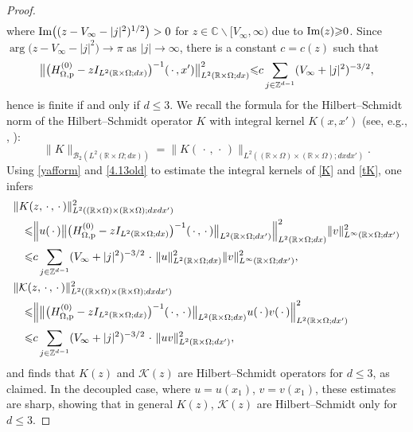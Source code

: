 \begin{proof}
\begin{align}
\end{align}
where
${\text{\rm Im}}\big((z - V_\infty - |j|^2)^{1/2}\big)>0$
for $z\in{{\mathbb{C}}}\backslash[V_\infty,\infty)$ due to ${\text{\rm Im}} (z) {\geqslant}0$. Since
$\arg\big(z - V_\infty - |j|^2\big)\to\pi$ as $|j|\to\infty$, there is
a constant $c=c(z)$ such that
\begin{equation}\label{4.13old}
\big\|\big(H^{(0)}_{\Omega, \rm p} - zI_{L^2({{\mathbb{R}}}\times\Omega; dx)}\big)^{-1}({\,\cdot\,},x')
\big\|_{L^2({{\mathbb{R}}}\times\Omega;dx)}^2{\leqslant} c
\sum_{j\in {{\mathbb{Z}}}^{d-1}} (V_\infty + |j|^2)^{-3/2},
\end{equation}
hence is finite if and only if $d{\leqslant} 3$. We recall the formula for
the Hilbert--Schmidt norm of the Hilbert--Schmidt operator $K$
with integral kernel $K(x,x')$ (see, e.g., \cite[Thm.\ 2.11]{Si05}, \cite[Sect.\ 1.6.5]{Ya92}):
\begin{equation}\label{yafform}
\|K\|_{{{\mathcal B}}_2(L^2({{\mathbb{R}}}\times\Omega;dx))}=
\|K({\,\cdot\,},{\,\cdot\,})\|_{L^2(({{\mathbb{R}}}\times\Omega)\times
({{\mathbb{R}}}\times\Omega); dx dx')}.
\end{equation}
Using \eqref{yafform} and \eqref{4.13old} to estimate the integral kernels
of \eqref{K} and \eqref{tK}, one infers
\begin{align}
& \|K(z,{\,\cdot\,},{\,\cdot\,})\|_{L^2(({{\mathbb{R}}}\times\Omega)\times
({{\mathbb{R}}}\times\Omega); dx dx')}^2 {\notag} \\
& \quad {\leqslant} \Big\|u({\,\cdot\,}) 
\big\|\big(H^{(0)}_{\Omega, \rm p} -zI_{L^2({{\mathbb{R}}}\times\Omega; dx)}\big)^{-1}
({\,\cdot\,},{\,\cdot\,})\big\|_{L^2({{\mathbb{R}}}\times\Omega;dx')}
\Big\|_{L^2({{\mathbb{R}}}\times\Omega;dx)}^2
\|v\|_{L^\infty({{\mathbb{R}}}\times\Omega;dx')}^2\nonumber\\
& \quad {\leqslant}
c\sum_{j\in {{\mathbb{Z}}}^{d-1}}
(V_\infty+|j|^2)^{-3/2}\,{\,\cdot\,}\,
\|u\|_{L^2({{\mathbb{R}}}\times\Omega;dx)}^2
\|v\|_{L^\infty({{\mathbb{R}}}\times\Omega;dx')}^2,\label{Kest}\\
& \|{{\mathcal K}}(z,{\,\cdot\,},{\,\cdot\,})\|_{L^2(({{\mathbb{R}}}\times\Omega)\times
({{\mathbb{R}}}\times\Omega); dx dx')}^2   {\notag} \\
&\quad {\leqslant} \Big\| 
\big\|\big(H^{(0)}_{\Omega, \rm p} -zI_{L^2({{\mathbb{R}}}\times\Omega; dx)}\big)^{-1}
({\,\cdot\,},{\,\cdot\,})\big\|_{L^2({{\mathbb{R}}}\times\Omega;dx)}
u({\,\cdot\,})v({\,\cdot\,})\Big\|_{L^2({{\mathbb{R}}}\times\Omega;dx')}^2\nonumber\\
& \quad {\leqslant}
c\sum_{j\in {{\mathbb{Z}}}^{d-1}} (V_\infty+|j|^2)^{-3/2}
\,{\,\cdot\,}\,
\|uv\|_{L^2({{\mathbb{R}}}\times\Omega;dx')}^2,\label{tKest}
\end{align}
and finds that $K(z)$ and ${{\mathcal K}}(z)$ are Hilbert--Schmidt
operators for $d{\leqslant} 3$, as claimed.
In the decoupled case, where $u=u(x_1)$, $v=v(x_1)$, these estimates are sharp,
showing that in general $K(z)$, ${{\mathcal K}}(z)$ are Hilbert--Schmidt only for $d{\leqslant} 3$.
\end{proof}

